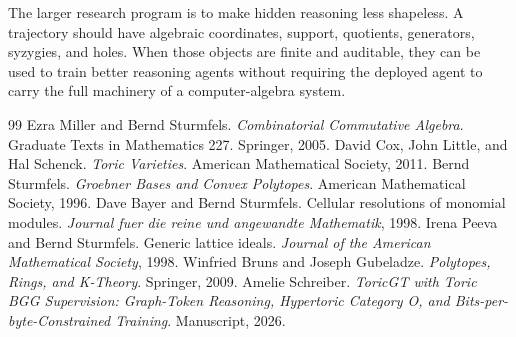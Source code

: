 \documentclass[11pt]{article}
\theoremstyle{definition}
\begin{document}
The larger research program is to make hidden reasoning less shapeless.  A trajectory should have algebraic coordinates, support, quotients, generators, syzygies, and holes.  When those objects are finite and auditable, they can be used to train better reasoning agents without requiring the deployed agent to carry the full machinery of a computer-algebra system.

\begin{thebibliography}{99}
 Ezra Miller and Bernd Sturmfels. \emph{Combinatorial Commutative Algebra}. Graduate Texts in Mathematics 227. Springer, 2005.
 David Cox, John Little, and Hal Schenck. \emph{Toric Varieties}. American Mathematical Society, 2011.
 Bernd Sturmfels. \emph{Groebner Bases and Convex Polytopes}. American Mathematical Society, 1996.
 Dave Bayer and Bernd Sturmfels. Cellular resolutions of monomial modules. \emph{Journal fuer die reine und angewandte Mathematik}, 1998.
 Irena Peeva and Bernd Sturmfels. Generic lattice ideals. \emph{Journal of the American Mathematical Society}, 1998.
 Winfried Bruns and Joseph Gubeladze. \emph{Polytopes, Rings, and K-Theory}. Springer, 2009.
 Amelie Schreiber. \emph{ToricGT with Toric BGG Supervision: Graph-Token Reasoning, Hypertoric Category O, and Bits-per-byte-Constrained Training}. Manuscript, 2026.
\end{thebibliography}
\end{document}
